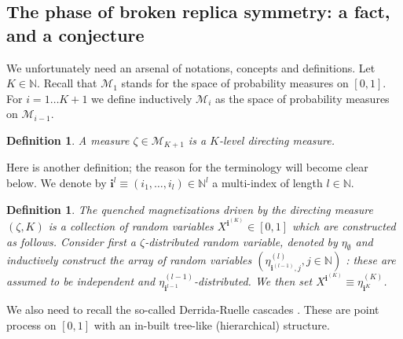 \documentclass[a4paper,12pt,oneside,reqno]{amsart}
\numberwithin{equation}{section}
\newtheorem{Def}[teor]{Definition}
\begin{document}
\subsection{The phase of broken replica symmetry: a fact, and a conjecture} \label{facconj}
We unfortunately need an arsenal of notations, concepts and definitions. Let $K \in {\mathbb{N}}$. Recall that $\mathcal M_1$ stands for the space of probability measures on $[0,1]$. For $i =1 \dots K+1$ we define inductively $\mathcal M_i$ as the space of probability measures on $\mathcal M_{i-1}$. 
\begin{Def}
A measure $\zeta \in \mathcal M_{K+1}$ is a \emph{$K$-level directing measure}. 
\end{Def}
Here is another definition; the reason for the terminology will become clear below. We denote by $\boldsymbol i^{l} {\equiv} (i_1, \dots, i_l) \in {\mathbb{N}}^{l}$ a multi-index of length $l \in {\mathbb{N}}$. 
\begin{Def}
The \emph{quenched magnetizations driven by the directing measure $(\zeta, K)$} is a collection of 
random variables $X^{\boldsymbol{i}^{(K)}} \in [0,1]$ which are constructed as follows. Consider first a $\zeta$-distributed random variable, denoted by  $\eta_\emptyset$ and inductively construct the array of random variables $\left( \eta_{\boldsymbol{i}^{(l-1)}, j}^{(l)}, {j \in {\mathbb{N}}}\right)$ : these are assumed to be independent and $\eta_{{\boldsymbol i}^{l-1}}^{(l-1)}$-distributed. We then set $X^{\boldsymbol{i}^{(K)}} {\equiv} \eta^{{(K)}}_{\boldsymbol{i}^{K}}$.
\end{Def}

We also need to recall the so-called Derrida-Ruelle cascades \cite{ruelle}. These are point process on  
$[0,1]$ with an in-built tree-like (hierarchical) structure. 
\end{document}
